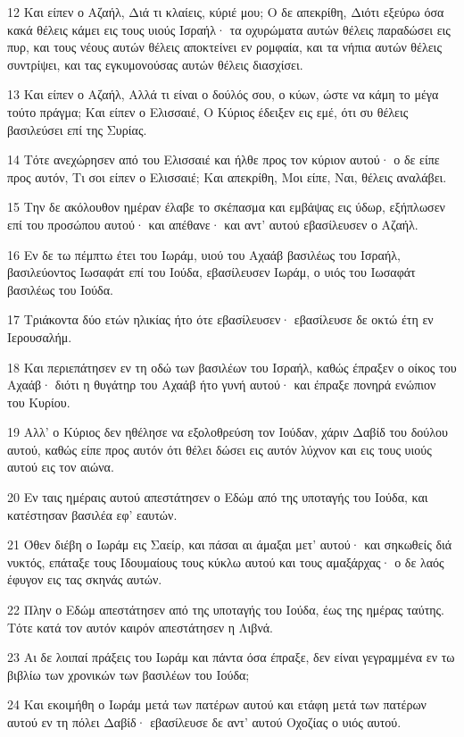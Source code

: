 \par 12 Και είπεν ο Αζαήλ, Διά τι κλαίεις, κύριέ μου; Ο δε απεκρίθη, Διότι εξεύρω όσα κακά θέλεις κάμει εις τους υιούς Ισραήλ· τα οχυρώματα αυτών θέλεις παραδώσει εις πυρ, και τους νέους αυτών θέλεις αποκτείνει εν ρομφαία, και τα νήπια αυτών θέλεις συντρίψει, και τας εγκυμονούσας αυτών θέλεις διασχίσει.
\par 13 Και είπεν ο Αζαήλ, Αλλά τι είναι ο δούλός σου, ο κύων, ώστε να κάμη το μέγα τούτο πράγμα; Και είπεν ο Ελισσαιέ, Ο Κύριος έδειξεν εις εμέ, ότι συ θέλεις βασιλεύσει επί της Συρίας.
\par 14 Τότε ανεχώρησεν από του Ελισσαιέ και ήλθε προς τον κύριον αυτού· ο δε είπε προς αυτόν, Τι σοι είπεν ο Ελισσαιέ; Και απεκρίθη, Μοι είπε, Ναι, θέλεις αναλάβει.
\par 15 Την δε ακόλουθον ημέραν έλαβε το σκέπασμα και εμβάψας εις ύδωρ, εξήπλωσεν επί του προσώπου αυτού· και απέθανε· και αντ' αυτού εβασίλευσεν ο Αζαήλ.
\par 16 Εν δε τω πέμπτω έτει του Ιωράμ, υιού του Αχαάβ βασιλέως του Ισραήλ, βασιλεύοντος Ιωσαφάτ επί του Ιούδα, εβασίλευσεν Ιωράμ, ο υιός του Ιωσαφάτ βασιλέως του Ιούδα.
\par 17 Τριάκοντα δύο ετών ηλικίας ήτο ότε εβασίλευσεν· εβασίλευσε δε οκτώ έτη εν Ιερουσαλήμ.
\par 18 Και περιεπάτησεν εν τη οδώ των βασιλέων του Ισραήλ, καθώς έπραξεν ο οίκος του Αχαάβ· διότι η θυγάτηρ του Αχαάβ ήτο γυνή αυτού· και έπραξε πονηρά ενώπιον του Κυρίου.
\par 19 Αλλ' ο Κύριος δεν ηθέλησε να εξολοθρεύση τον Ιούδαν, χάριν Δαβίδ του δούλου αυτού, καθώς είπε προς αυτόν ότι θέλει δώσει εις αυτόν λύχνον και εις τους υιούς αυτού εις τον αιώνα.
\par 20 Εν ταις ημέραις αυτού απεστάτησεν ο Εδώμ από της υποταγής του Ιούδα, και κατέστησαν βασιλέα εφ' εαυτών.
\par 21 Όθεν διέβη ο Ιωράμ εις Σαείρ, και πάσαι αι άμαξαι μετ' αυτού· και σηκωθείς διά νυκτός, επάταξε τους Ιδουμαίους τους κύκλω αυτού και τους αμαξάρχας· ο δε λαός έφυγον εις τας σκηνάς αυτών.
\par 22 Πλην ο Εδώμ απεστάτησεν από της υποταγής του Ιούδα, έως της ημέρας ταύτης. Τότε κατά τον αυτόν καιρόν απεστάτησεν η Λιβνά.
\par 23 Αι δε λοιπαί πράξεις του Ιωράμ και πάντα όσα έπραξε, δεν είναι γεγραμμένα εν τω βιβλίω των χρονικών των βασιλέων του Ιούδα;
\par 24 Και εκοιμήθη ο Ιωράμ μετά των πατέρων αυτού και ετάφη μετά των πατέρων αυτού εν τη πόλει Δαβίδ· εβασίλευσε δε αντ' αυτού Οχοζίας ο υιός αυτού.

